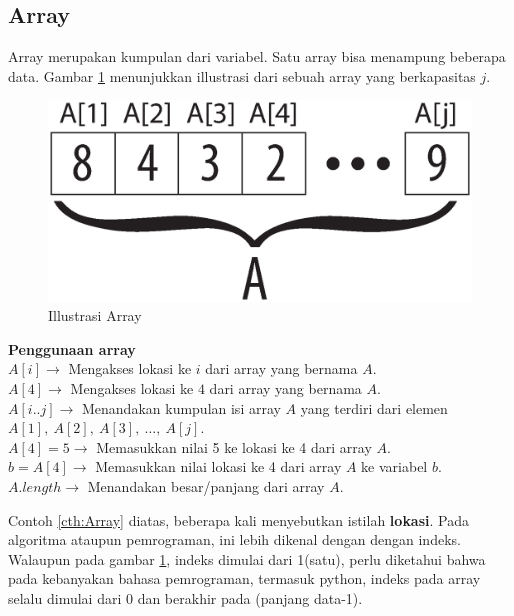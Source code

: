 \begin{enumerate}
\subsection{Array}
Array merupakan kumpulan dari variabel. Satu array bisa menampung beberapa data. Gambar \ref{fig:illustrasiArray} menunjukkan illustrasi dari sebuah array yang berkapasitas $j$. 
\begin{center}
	\begin{figure}[h!]%
		\includegraphics[scale=0.4]{fig/Array.eps}%
		\caption{Illustrasi Array}%
		\label{fig:illustrasiArray}%
	\end{figure}
\end{center}
\begin{contoh}
\label{cth:Array}
	\textbf{Penggunaan array}\\
	$A[i] \rightarrow$ Mengakses lokasi ke $i$ dari array yang bernama $A$.\\
	$A[4] \rightarrow$ Mengakses lokasi ke $4$ dari array yang bernama $A$.\\
	$A[i..j] \rightarrow$ Menandakan kumpulan isi array $A$ yang terdiri dari elemen $A[1],\ A[2],\ A[3],\ \ldots,\ A[j]$.\\
	$A[4] = 5 \rightarrow$ Memasukkan nilai 5 ke lokasi ke 4 dari array $A$.\\
	$b = A[4] \rightarrow$ Memasukkan nilai lokasi ke 4 dari array $A$ ke variabel $b$. 
	$A.length \rightarrow$ Menandakan besar/panjang dari array $A$.
\end{contoh}
	

Contoh \ref{cth:Array} diatas, beberapa kali menyebutkan istilah \textbf{lokasi}. Pada algoritma ataupun pemrograman, ini lebih dikenal dengan dengan indeks. Walaupun pada gambar \ref{fig:illustrasiArray}, indeks dimulai dari 1(satu), perlu diketahui bahwa pada kebanyakan bahasa pemrograman, termasuk python, indeks pada array selalu dimulai dari 0 dan berakhir pada (panjang data-1). \\


\end{enumerate}
